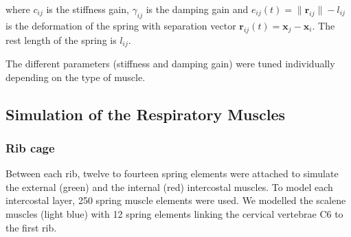 \documentclass[boxedsections ,landscape, a0]{sciposter_v2}
\begin{document}
\begin{multicols}{4}
where $ c_{ij} $ is the stiffness gain, $ \gamma_{ij} $ is the damping gain and $ e_{ij}(t) = \lVert \mathbf{r}_{ij} \rVert - l_{ij} $ is the deformation of the spring with separation vector $ \mathbf{r}_{ij}(t) = \mathbf{x}_{j} - \mathbf{x}_{i} $. The rest length of the spring is $ l_{ij} $.

The different parameters (stiffness and damping gain) were tuned individually
depending on the type of muscle.

\vspace{0.5\bigskipamount}

\subsection{Simulation of the Respiratory Muscles}
\vspace{-1.5\bigskipamount}
	\subsubsection{Rib cage}
\vspace{-0.5\bigskipamount}
Between each rib, twelve to fourteen spring elements were
attached to simulate the external (green) and the internal (red) intercostal muscles. To model each intercostal layer, 250 spring muscle elements were used. We modelled the scalene muscles (light blue) with 12 spring elements linking the cervical vertebrae
C6 to the first rib.

\begin{figure}
\centering
{}
\end{figure}	
\vspace{-2\bigskipamount}


\end{multicols}
\end{document}

